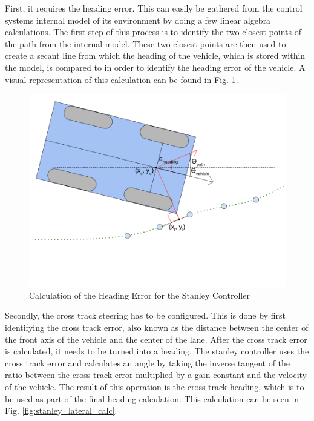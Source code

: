 \documentclass[titlepage]{article}
\begin{document}
{First, it requires the heading error. This can easily be gathered from the control systems internal model of its environment by doing a few linear algebra calculations. The first step of this process is to identify the two closest points of the path from the internal model. These two closest points are then used to create a secant line from which the heading of the vehicle, which is stored within the model, is compared to in order to identify the heading error of the vehicle. A visual representation of this calculation can be found in Fig. \ref{fig:stanley_heading_calc}.

\begin{figure}
	\centering
	\includegraphics[width=5in]{stanley_heading_error}
	\caption{Calculation of the Heading Error for the Stanley Controller}
	\label{fig:stanley_heading_calc}
\end{figure}

Secondly, the cross track steering has to be configured. This is done by first identifying the cross track error, also known as the distance between the center of the front axis of the vehicle and the center of the lane. After the cross track error is calculated, it needs to be turned into a heading. The stanley controller uses the cross track error and calculates an angle by taking the inverse tangent of the ratio between the cross track error multiplied by a gain constant and the velocity of the vehicle. The result of this operation is the cross track heading, which is to be used as part of the final heading calculation. This calculation can be seen in Fig. \ref{fig:stanley_lateral_calc}.

}
\end{document}
